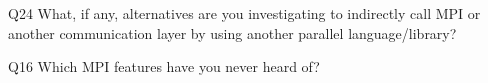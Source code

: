 \begin{description}%
\item{Q24} What, if any, alternatives are you investigating to indirectly call MPI or another communication layer by using another parallel language/library?%
\item{Q16} Which MPI features have you never heard of?%
\end{description}%
